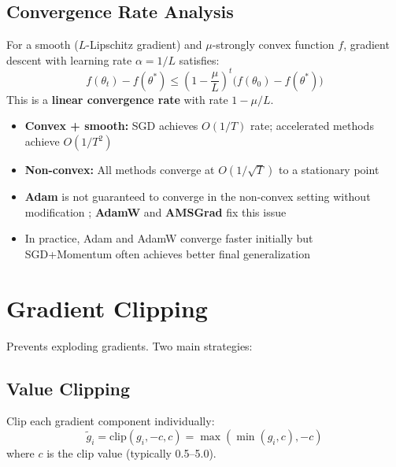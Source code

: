 \subsection{Convergence Rate Analysis}

\begin{theorem}
For a smooth ($L$-Lipschitz gradient) and $\mu$-strongly convex function $f$, gradient descent with learning rate $\alpha = 1/L$ satisfies:
\begin{equation}
f(\theta_t) - f(\theta^*) \leq \left(1 - \frac{\mu}{L}\right)^t \bigl(f(\theta_0) - f(\theta^*)\bigr)
\end{equation}
This is a \textbf{linear convergence rate} with rate $1 - \mu/L$.
\end{theorem}

\begin{properties}
\begin{itemize}
    \item \textbf{Convex + smooth:} SGD achieves $O(1/T)$ rate; accelerated methods achieve $O(1/T^2)$
    \item \textbf{Non-convex:} All methods converge at $O(1/\sqrt{T})$ to a stationary point
    \item \textbf{Adam} is not guaranteed to converge in the non-convex setting without modification \cite{reddi2018convergence}; \textbf{AdamW} and \textbf{AMSGrad} fix this issue
    \item In practice, Adam and AdamW converge faster initially but SGD+Momentum often achieves better final generalization
\end{itemize}
\end{properties}

\section{Gradient Clipping}

Prevents exploding gradients. Two main strategies:

\subsection{Value Clipping}

Clip each gradient component individually:
\begin{equation}
\tilde{g}_i = \text{clip}(g_i, -c, c) = \max(\min(g_i, c), -c)
\end{equation}
where $c$ is the clip value (typically 0.5--5.0).

